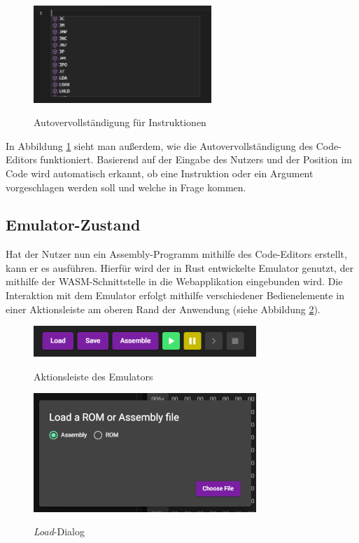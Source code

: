 \begin{figure}
    \caption{Autovervollständigung für Instruktionen}
    \centering
    \includegraphics[width=0.6\textwidth]{Bilder/Completion1.png}
    \label{fig:completion1}
\end{figure}

In Abbildung \ref{fig:completion1} sieht man außerdem, wie die Autovervollständigung des Code-Editors funktioniert. Basierend auf der Eingabe des Nutzers und der Position im Code wird automatisch erkannt, ob eine Instruktion oder ein Argument vorgeschlagen werden soll und welche in Frage kommen.

\subsection{Emulator-Zustand}

Hat der Nutzer nun ein Assembly-Programm mithilfe des Code-Editors erstellt, kann er es ausführen. Hierfür wird der in Rust entwickelte Emulator genutzt, der mithilfe der \ac{WASM}-Schnittstelle in die Webapplikation eingebunden wird. Die Interaktion mit dem Emulator erfolgt mithilfe verschiedener Bedienelemente in einer Aktionsleiste am oberen Rand der Anwendung (siehe Abbildung \ref{fig:actionbar}).

\begin{figure}[h]
    \caption{Aktionsleiste des Emulators}
    \centering
    \includegraphics[width=0.75\textwidth]{Bilder/Aktionsleiste.png}
    \label{fig:actionbar}
\end{figure}

\begin{figure}
    \caption{\textit{Load}-Dialog}
    \centering
    \includegraphics[width=0.75\textwidth]{Bilder/LoadDialog.png}
    \label{fig:loaddialog}
\end{figure}

